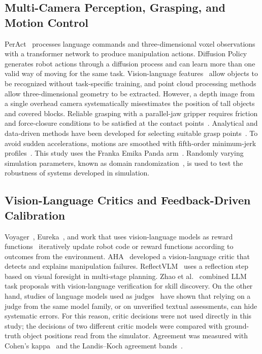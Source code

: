 \documentclass[preprint,12pt]{elsarticle}
\begin{document}
\subsection{Multi-Camera Perception, Grasping, and Motion Control}

PerAct~\cite{shridhar2023peract} processes language commands and three-dimensional voxel observations with a transformer network to produce manipulation actions. Diffusion Policy~\cite{chi2024diffusion} generates robot actions through a diffusion process and can learn more than one valid way of moving for the same task. Vision-language features~\cite{radford2021clip} allow objects to be recognized without task-specific training, and point cloud processing methods~\cite{rusu2011pcl} allow three-dimensional geometry to be extracted. However, a depth image from a single overhead camera systematically misestimates the position of tall objects and covered blocks. Reliable grasping with a parallel-jaw gripper requires friction and force-closure conditions to be satisfied at the contact points~\cite{bicchi2000grasping}. Analytical and data-driven methods have been developed for selecting suitable grasp points~\cite{bohg2014grasp}. To avoid sudden accelerations, motions are smoothed with fifth-order minimum-jerk profiles~\cite{flash1985coordination}. This study uses the Franka Emika Panda arm~\cite{haddadin2022franka}. Randomly varying simulation parameters, known as domain randomization~\cite{tobin2017domain}, is used to test the robustness of systems developed in simulation.

\subsection{Vision-Language Critics and Feedback-Driven Calibration}

Voyager~\cite{wang2024voyager}, Eureka~\cite{ma2024eureka}, and work that uses vision-language models as reward functions~\cite{rocamonde2024vlmrm} iteratively update robot code or reward functions according to outcomes from the environment. AHA~\cite{duan2025aha} developed a vision-language critic that detects and explains manipulation failures. ReflectVLM~\cite{feng2025reflectvlm} uses a reflection step based on visual foresight in multi-stage planning. Zhao et al.~\cite{zhao2026agentic} combined LLM task proposals with vision-language verification for skill discovery. On the other hand, studies of language models used as judges~\cite{zheng2023judging} have shown that relying on a judge from the same model family, or on unverified textual assessments, can hide systematic errors. For this reason, critic decisions were not used directly in this study; the decisions of two different critic models were compared with ground-truth object positions read from the simulator. Agreement was measured with Cohen's kappa~\cite{cohen1960kappa} and the Landis--Koch agreement bands~\cite{landis1977kappa}.
\end{document}

